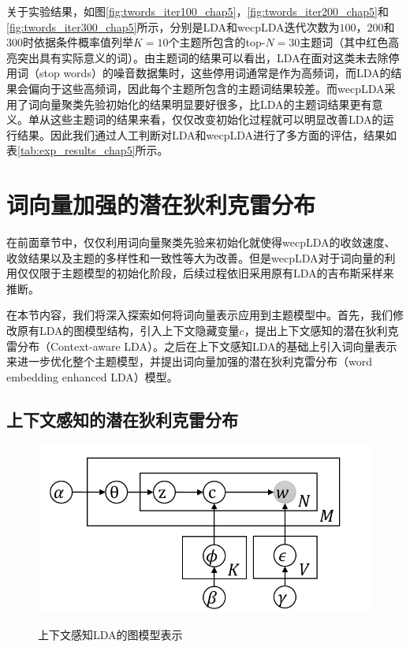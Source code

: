 \documentclass[master]{njuthesis}
\begin{document}
关于实验结果，如图\ref{fig:twords_iter100_chap5}，\ref{fig:twords_iter200_chap5}和\ref{fig:twords_iter300_chap5}所示，分别是LDA和wecpLDA迭代次数为$100$，$200$和$300$时依据条件概率值列举$K=10$个主题所包含的top-$N=30$主题词（其中红色高亮突出具有实际意义的词）。由主题词的结果可以看出，LDA在面对这类未去除停用词（stop words）的噪音数据集时，这些停用词通常是作为高频词，而LDA的结果会偏向于这些高频词，因此每个主题所包含的主题词结果较差。而wecpLDA采用了词向量聚类先验初始化的结果明显要好很多，比LDA的主题词结果更有意义。单从这些主题词的结果来看，仅仅改变初始化过程就可以明显改善LDA的运行结果。因此我们通过人工判断对LDA和wecpLDA进行了多方面的评估，结果如表\ref{tab:exp_results_chap5}所示。

\section{词向量加强的潜在狄利克雷分布}\label{sec_enhanced_lda_chap5}

在前面章节中，仅仅利用词向量聚类先验来初始化就使得wecpLDA的收敛速度、收敛结果以及主题的多样性和一致性等大为改善。但是wecpLDA对于词向量的利用仅仅限于主题模型的初始化阶段，后续过程依旧采用原有LDA的吉布斯采样来推断。
 
在本节内容，我们将深入探索如何将词向量表示应用到主题模型中。首先，我们修改原有LDA的图模型结构，引入上下文隐藏变量$c$，提出上下文感知的潜在狄利克雷分布（Context-aware LDA）。之后在上下文感知LDA的基础上引入词向量表示来进一步优化整个主题模型，并提出词向量加强的潜在狄利克雷分布（word embedding enhanced LDA）模型。
 
\subsection{上下文感知的潜在狄利克雷分布}\label{subsec_context_aware_lda_chap5}

\begin{figure}[htbp]
\centering
\includegraphics[width= 1.0\textwidth]{figures//caLDA_chap5.pdf}\\
\caption{上下文感知LDA的图模型表示}\label{fig:caLDA_chap5}
\end{figure}
\end{document}

